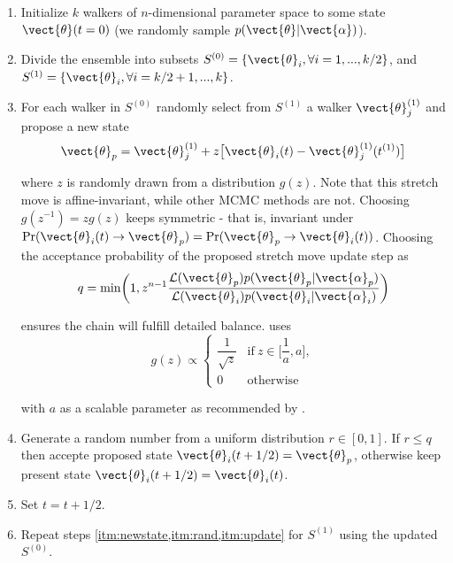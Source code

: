 \begin{enumerate}
\item Initialize $k$ walkers of $n$-dimensional parameter space to some state $\vect{\theta}(t = 0)$ (we randomly sample
$p(\vect{\theta}|\vect{\alpha})$).

\item \label{itm:divide} Divide the ensemble into subsets $S^{(0)} = \{\vect{\theta}_i, \forall i = 1, . . ., k/2\}$, and
$S^{(1)} = \{\vect{\theta}_i, \forall i = k/2 + 1, . . ., k\}$.

\item \label{itm:newstate} For each walker in $S^{(0)}$ randomly select from $S^{(1)}$ a walker $\vect{\theta}_j^{(1)}$ and propose a new
state
\begin{equation}
\vect{\theta}_p = \vect{\theta}_j^{(1)} + z \big[ \vect{\theta}_i(t) - \vect{\theta}_j^{(1)}(t^{(1)}) \big]
\label{eq:er_nr_calibrations_parameter_determ_mcmc_walker_update}
\end{equation}

\noindent where $z$ is randomly drawn from a distribution $g(z)$.  Note that this stretch move is affine-invariant, while other MCMC
methods are not.  Choosing
$g(z^{-1}) = z g(z)$ keeps  symmetric - that is, invariant under
$\mathrm{Pr}(\vect{\theta}_i(t) \rightarrow \vect{\theta}_p) = \mathrm{Pr}(\vect{\theta}_p \rightarrow \vect{\theta}_i(t))$.  Choosing the
acceptance probability of the proposed stretch move update step as
\begin{equation}
q = \mathrm{min} \bigg( 1, z^{n - 1} \frac{\mathcal{L}(\vect{\theta}_p)p(\vect{\theta}_p|\vect{\alpha}_p)}
{\mathcal{L}(\vect{\theta}_i)p(\vect{\theta}_i|\vect{\alpha}_i)} \bigg)
\label{eq:er_nr_calibrations_parameter_determ_mcmc_prob}
\end{equation}

\noindent ensures the chain will fulfill detailed balance.   uses
\begin{equation}
g(z) \propto
\begin{cases}
\dfrac{1}{\sqrt{z}} & \mathrm{if}\ z \in \bigg[ \dfrac{1}{a}, a \bigg], \\
0 & \mathrm{otherwise}
\end{cases}
\end{equation}

\noindent with $a$ as a scalable parameter as recommended by .

\item \label{itm:rand} Generate a random number from a uniform distribution $r \in [0, 1]$.  If $r \leq q$ then accepte proposed state
$\vect{\theta}_i(t + 1/2) = \vect{\theta}_p$, otherwise keep present state $\vect{\theta}_i(t + 1/2) = \vect{\theta}_i(t)$.

\item \label{itm:update}  Set $t = t + 1/2$.

\item Repeat steps \cref{itm:newstate,itm:rand,itm:update} for $S^{(1)}$ using the updated $S^{(0)}$.
\end{enumerate}

